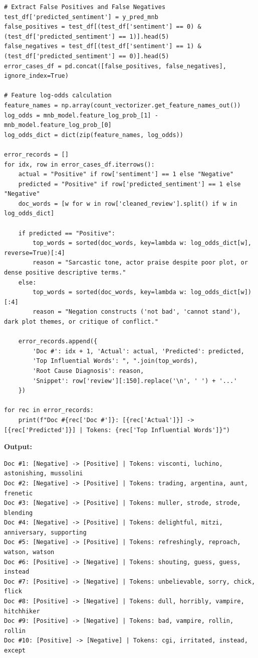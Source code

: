 \documentclass[12pt]{article}
\begin{document}
\begin{lstlisting}[style=code]
# Extract False Positives and False Negatives
test_df['predicted_sentiment'] = y_pred_mnb
false_positives = test_df[(test_df['sentiment'] == 0) & (test_df['predicted_sentiment'] == 1)].head(5)
false_negatives = test_df[(test_df['sentiment'] == 1) & (test_df['predicted_sentiment'] == 0)].head(5)
error_cases_df = pd.concat([false_positives, false_negatives], ignore_index=True)

# Feature log-odds calculation
feature_names = np.array(count_vectorizer.get_feature_names_out())
log_odds = mnb_model.feature_log_prob_[1] - mnb_model.feature_log_prob_[0]
log_odds_dict = dict(zip(feature_names, log_odds))

error_records = []
for idx, row in error_cases_df.iterrows():
    actual = "Positive" if row['sentiment'] == 1 else "Negative"
    predicted = "Positive" if row['predicted_sentiment'] == 1 else "Negative"
    doc_words = [w for w in row['cleaned_review'].split() if w in log_odds_dict]
    
    if predicted == "Positive":
        top_words = sorted(doc_words, key=lambda w: log_odds_dict[w], reverse=True)[:4]
        reason = "Sarcastic tone, actor praise despite poor plot, or dense positive descriptive terms."
    else:
        top_words = sorted(doc_words, key=lambda w: log_odds_dict[w])[:4]
        reason = "Negation constructs ('not bad', 'cannot stand'), dark plot themes, or critique of conflict."
        
    error_records.append({
        'Doc #': idx + 1, 'Actual': actual, 'Predicted': predicted,
        'Top Influential Words': ", ".join(top_words),
        'Root Cause Diagnosis': reason,
        'Snippet': row['review'][:150].replace('\n', ' ') + '...'
    })

for rec in error_records:
    print(f"Doc #{rec['Doc #']}: [{rec['Actual']}] -> [{rec['Predicted']}] | Tokens: {rec['Top Influential Words']}")
\end{lstlisting}

\textbf{Output:}

\begin{lstlisting}[style=output]
Doc #1: [Negative] -> [Positive] | Tokens: visconti, luchino, astonishing, mussolini
Doc #2: [Negative] -> [Positive] | Tokens: trading, argentina, aunt, frenetic
Doc #3: [Negative] -> [Positive] | Tokens: muller, strode, strode, blending
Doc #4: [Negative] -> [Positive] | Tokens: delightful, mitzi, anniversary, supporting
Doc #5: [Negative] -> [Positive] | Tokens: refreshingly, reproach, watson, watson
Doc #6: [Positive] -> [Negative] | Tokens: shouting, guess, guess, instead
Doc #7: [Positive] -> [Negative] | Tokens: unbelievable, sorry, chick, flick
Doc #8: [Positive] -> [Negative] | Tokens: dull, horribly, vampire, hitchhiker
Doc #9: [Positive] -> [Negative] | Tokens: bad, vampire, rollin, rollin
Doc #10: [Positive] -> [Negative] | Tokens: cgi, irritated, instead, except
\end{lstlisting}
\end{document}
